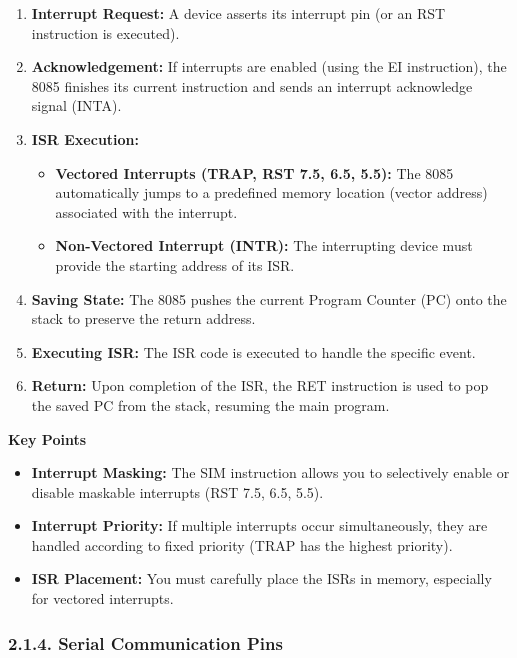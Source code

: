 \documentclass[
]{article}
\begin{document}
\begin{enumerate}
\def\labelenumi{\arabic{enumi}.}
\item
  \textbf{Interrupt Request:} A device asserts its interrupt pin (or an
  RST instruction is executed).
\item
  \textbf{Acknowledgement:} If interrupts are enabled (using the EI
  instruction), the 8085 finishes its current instruction and sends an
  interrupt acknowledge signal (INTA).
\item
  \textbf{ISR Execution:}

  \begin{itemize}
  \item
    \textbf{Vectored Interrupts (TRAP, RST 7.5, 6.5, 5.5):} The 8085
    automatically jumps to a predefined memory location (vector address)
    associated with the interrupt.
  \item
    \textbf{Non-Vectored Interrupt (INTR):} The interrupting device must
    provide the starting address of its ISR.
  \end{itemize}
\item
  \textbf{Saving State:} The 8085 pushes the current Program Counter
  (PC) onto the stack to preserve the return address.
\item
  \textbf{Executing ISR:} The ISR code is executed to handle the
  specific event.
\item
  \textbf{Return:} Upon completion of the ISR, the RET instruction is
  used to pop the saved PC from the stack, resuming the main program.
\end{enumerate}

\textbf{Key Points}

\begin{itemize}
\item
  \textbf{Interrupt Masking:} The SIM instruction allows you to
  selectively enable or disable maskable interrupts (RST 7.5, 6.5, 5.5).
\item
  \textbf{Interrupt Priority:} If multiple interrupts occur
  simultaneously, they are handled according to fixed priority (TRAP has
  the highest priority).
\item
  \textbf{ISR Placement:} You must carefully place the ISRs in memory,
  especially for vectored interrupts.
\end{itemize}

\hypertarget{214-serial-communication-pins}{%
\subsubsection{2.1.4. Serial Communication
Pins}\label{214-serial-communication-pins}}
\end{document}
